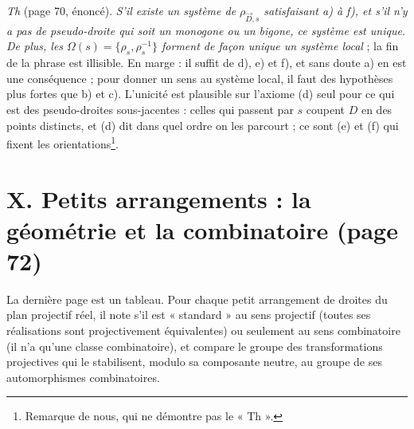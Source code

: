 \documentclass[11pt,a4paper]{article}
\begin{document}
\emph{Th} (page 70, énoncé). \emph{S'il existe un système de
$\rho_{\vec{D},s}$ satisfaisant a) à f), et s'il n'y a pas de pseudo-droite
qui soit un monogone ou un bigone, ce système est unique. De plus, les
$\Omega(s) = \{\rho_s, \rho_s^{-1}\}$ forment de façon unique un système
local} ; la fin de la phrase est illisible. En marge : il suffit de d), e)
et f), et sans doute a) en est une conséquence ; pour donner un sens au
système local, il faut des hypothèses plus fortes que b) et c). L'unicité
est plausible sur l'axiome (d) seul pour ce qui est des pseudo-droites sous-jacentes :
celles qui passent par $s$ coupent $D$ en des points distincts, et (d) dit
dans quel ordre on les parcourt ; ce sont (e) et (f) qui fixent les
orientations\footnote{Remarque de nous, qui ne démontre pas le « Th ».}.

\section*{X. Petits arrangements : la géométrie et la combinatoire (page 72)}

La dernière page est un tableau. Pour chaque petit arrangement de droites du
plan projectif réel, il note s'il est « standard » au sens projectif
(toutes ses réalisations sont projectivement équivalentes) ou seulement au
sens combinatoire (il n'a qu'une classe combinatoire), et compare le
groupe des transformations projectives qui le stabilisent, modulo sa
composante neutre, au groupe de ses automorphismes combinatoires.
\end{document}
